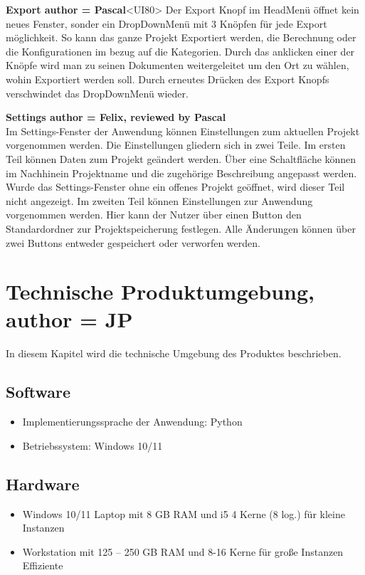\documentclass[parskip=full]{scrartcl} %
\begin{document}
\textbf{Export author = Pascal}<UI80>
Der Export Knopf im HeadMenü öffnet kein neues Fenster, sonder ein DropDownMenü mit 3 Knöpfen für jede Export möglichkeit. So kann das ganze Projekt Exportiert werden, die Berechnung oder die Konfigurationen im bezug auf die Kategorien. Durch das anklicken einer der Knöpfe wird man zu seinen Dokumenten weitergeleitet um den Ort zu wählen, wohin Exportiert werden soll.
Durch erneutes Drücken des Export Knopfs verschwindet das DropDownMenü wieder.

\textbf{Settings author = Felix, reviewed by Pascal}\\
Im Settings-Fenster der Anwendung können Einstellungen zum aktuellen Projekt vorgenommen werden.
Die Einstellungen gliedern sich in zwei Teile.
Im ersten Teil können Daten zum Projekt geändert werden. Über eine Schaltfläche können im Nachhinein Projektname und die zugehörige Beschreibung angepasst werden. Wurde das Settings-Fenster ohne ein offenes Projekt geöffnet, wird dieser Teil nicht angezeigt.
Im zweiten Teil können Einstellungen zur Anwendung vorgenommen werden. Hier kann der Nutzer über einen Button den Standardordner zur Projektspeicherung festlegen.
Alle Änderungen können über zwei Buttons entweder gespeichert oder verworfen werden.

\newpage



\section{Technische Produktumgebung, author = JP}
In diesem Kapitel wird die technische Umgebung des Produktes beschrieben.

\subsection{Software}
\begin{itemize}
    \item Implementierungssprache der Anwendung: Python
    \item Betriebssystem: Windows 10/11
\end{itemize}

\subsection{Hardware}
\begin{itemize}
    \item Windows 10/11 Laptop mit 8 GB RAM und i5 4 Kerne (8 log.) für kleine Instanzen
    \item Workstation mit 125 – 250 GB RAM und 8-16 Kerne für große Instanzen Effiziente
\end{itemize}
\end{document}
